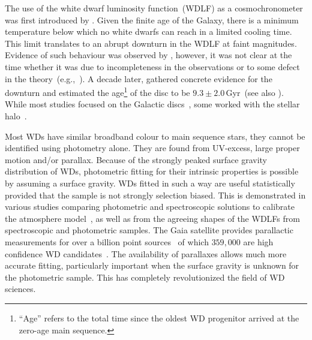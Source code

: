 \documentclass[fleqn,usenatbib]{mnras}
\begin{document}
The use of the white dwarf luminosity function~(WDLF) as a cosmochronometer was
first introduced by \citet{1959ApJ...129..243S}. Given the finite age of the
Galaxy, there is a minimum temperature below which no white dwarfs can reach in
a limited cooling time. This limit translates to an abrupt downturn in the WDLF
at faint magnitudes. Evidence of such behaviour was observed by
\citet{1979ApJ...233..226L}, however, it was not clear at the time whether it
was due to incompleteness in the observations or to some defect in the
theory~(e.g.,~\citealp{1984ApJ...282..615I}). A decade later,
\citet{1987ApJ...315L..77W} gathered concrete evidence for the downturn and
estimated the age\footnote{``Age'' refers to the total time since the oldest
WD progenitor arrived at the zero-age main sequence.} of the disc to be
$9.3 \pm 2.0$\,Gyr~(see also \citealt{1988ApJ...332..891L}). While most studies
focused on the Galactic discs~\citep{1989LNP...328...15L, 1992ApJ...386..539W,
1995LNP...443...24O, 1998ApJ...497..294L, 1999MNRAS.306..736K,
2012ApJS..199...29G, 2021A&A...649A...6G}, some worked with the stellar
halo~\citep{2006AJ....131..571H, 2011MNRAS.417...93R, 2017AJ....153...10M,
2019MNRAS.482..715L, 2021MNRAS.502.1753T}.
 
Most WDs have similar broadband colour to main sequence stars, they cannot be
identified using photometry alone. They are found from UV-excess, large
proper motion and/or parallax. Because of the strongly peaked surface gravity
distribution of WDs, photometric fitting for their intrinsic properties
is possible by assuming a surface gravity. WDs fitted in such a way are useful
statistically provided that the sample is not strongly selection biased. This
is demonstrated in various studies comparing photometric and spectroscopic
solutions to calibrate the atmosphere
model~\citep{2019ApJ...871..169G, 2019ApJ...882..106G}, as well as from the
agreeing shapes of the WDLFs from spectroscopic and photometric samples. The
Gaia satellite provides parallactic measurements for over a billion point
sources~\citep{2021A&A...649A...1G, 2021AJ....161..147B} of which $359,000$
are high confidence WD candidates~\citep[][hereafter, GF21]{2021MNRAS.508.3877G}.
The availability of parallaxes allows much more accurate fitting, particularly
important when the surface gravity is unknown for the photometric sample. This
has completely revolutionized the field of WD sciences. 
\end{document}

